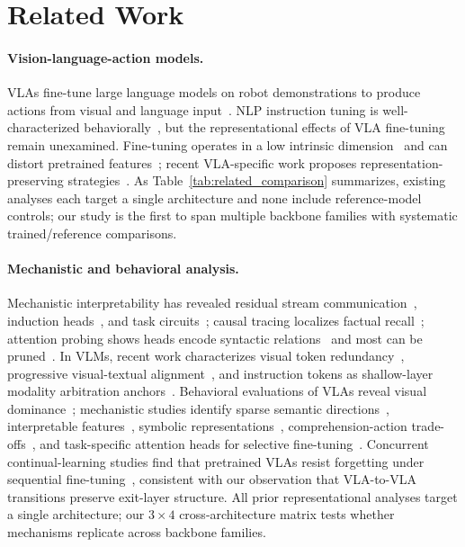 \section{Related Work}\label{sec:related_work}

\paragraph{Vision-language-action models.}
VLAs fine-tune large language models on robot demonstrations to produce actions from visual and language input~\cite{brohan2023_rt2,kim2024_openvla,karamcheti2024,black2024_pi0,zheng2024tracevla,hung2025nora,xiao2025ava}.
NLP instruction tuning is well-characterized behaviorally~\cite{wei2022finetuned,ouyang2022training}, but the representational effects of VLA fine-tuning remain unexamined.
Fine-tuning operates in a low intrinsic dimension~\cite{aghajanyan2021intrinsic} and can distort pretrained features~\cite{kumar2022finetuning}; recent VLA-specific work proposes representation-preserving strategies~\cite{grover2025preserving,hancock2025actions}. As Table~\ref{tab:related_comparison} summarizes, existing analyses each target a single architecture and none include reference-model controls; our study is the first to span multiple backbone families with systematic trained/reference comparisons.

\paragraph{Mechanistic and behavioral analysis.}
Mechanistic interpretability has revealed residual stream communication~\cite{elhage2021}, induction heads~\cite{olsson2022}, and task circuits~\cite{wang2023_ioi,conmy2023}; causal tracing localizes factual recall~\cite{meng2022_rome}; attention probing shows heads encode syntactic relations~\cite{clark2019} and most can be pruned~\cite{michel2019sixteen}.
In VLMs, recent work characterizes visual token redundancy~\cite{fan2026visual}, progressive visual-textual alignment~\cite{neo2025interpreting,long2026understanding}, and instruction tokens as shallow-layer modality arbitration anchors~\cite{zhang2026instruction}.
Behavioral evaluations of VLAs reveal visual dominance~\cite{grant2026,hou2026,fei2025}; mechanistic studies identify sparse semantic directions~\cite{haon2025}, interpretable features~\cite{swann2026,buurmeijer2026}, symbolic representations~\cite{lu2025,molinari2025}, comprehension-action trade-offs~\cite{fang2025}, and task-specific attention heads for selective fine-tuning~\cite{mitra2025mechanistic}.
Concurrent continual-learning studies find that pretrained VLAs resist forgetting under sequential fine-tuning~\cite{liu2026forgetting}, consistent with our observation that VLA-to-VLA transitions preserve exit-layer structure.
All prior representational analyses target a single architecture; our $3 \times 4$ cross-architecture matrix tests whether mechanisms replicate across backbone families.

